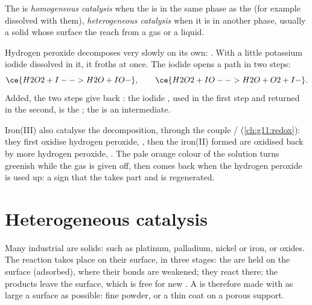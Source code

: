 \begin{definition}\label{def:g12:catalysis:homogeneous}
The  is \emph{homogeneous catalysis}
when the  is in the same phase as the  (for example
dissolved with them), \emph{heterogeneous catalysis} when it is in another phase, usually a solid whose surface
the  reach from a gas or a liquid.
\end{definition}

\begin{example}\label{ex:g12:catalysis:iodide}
Hydrogen peroxide decomposes very slowly on its own:
. With a little potassium iodide dissolved in it,
it froths at once. The iodide  opens a path in two steps:
\[
  \ce{H2O2 + I- -> H2O + IO-}, \qquad
  \ce{H2O2 + IO- -> H2O + O2 + I-} .
\]
Added, the two steps give back : the iodide ,
used in the first step and returned in the second, is the ; the
  is an intermediate.
\end{example}


\begin{example}\label{ex:g12:catalysis:iron}
Iron(III)  also catalyse the decomposition, through the couple
/ (\cref{ch:g11:redox}): they first oxidise
hydrogen peroxide, , then the
iron(II)  formed are oxidised back by more hydrogen peroxide,
. The pale orange colour of
the solution turns greenish while the gas is given off, then comes back
when the hydrogen peroxide is used up: a sign that the  takes part
and is regenerated.
\end{example}

\section{Heterogeneous catalysis}

Many industrial  are solids:  such as platinum, palladium,
nickel or iron, or oxides. The reaction takes place on their surface,
in three stages: the   are held on the surface
(adsorbed), where their bonds are weakened; they react there; the
products leave the surface, which is free for new . A 
is therefore made with as large a surface as possible: fine powder, or a
thin coat on a porous support.

